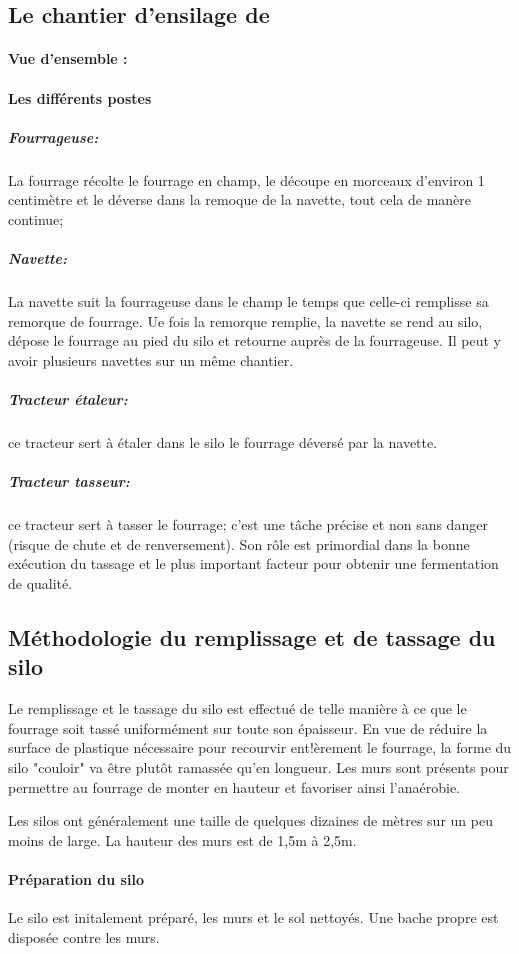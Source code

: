\documentclass[12pt,a4paper]{report}
\begin{document}
\subsection{Le chantier d'ensilage de }

\paragraph{Vue d'ensemble :} 

\paragraph{Les différents postes}
\subparagraph{Fourrageuse:} La fourrage récolte le fourrage en champ, le découpe en morceaux d'environ 1 centimètre et le déverse dans la remoque de la navette, tout cela de manère continue;
\subparagraph{Navette:} La navette suit la fourrageuse dans le champ le temps que celle-ci remplisse sa remorque de fourrage. Ue fois la remorque remplie, la navette se rend au silo, dépose le fourrage au pied du silo et retourne auprès de la fourrageuse. Il peut y avoir plusieurs navettes sur un même chantier.
\subparagraph{Tracteur étaleur:}ce tracteur sert à étaler dans le silo le fourrage déversé par la navette.
\subparagraph{Tracteur tasseur:}ce tracteur sert à tasser le fourrage; c'est une tâche précise et non sans danger (risque de chute et de renversement). Son rôle est primordial dans la bonne exécution du tassage et le plus important facteur pour obtenir une fermentation de qualité.

\subsection{Méthodologie du remplissage et de tassage du silo}

Le remplissage et le tassage du silo est effectué de telle manière à ce que le fourrage soit tassé uniformément sur toute son épaisseur. En vue de réduire la surface de plastique nécessaire pour recourvir ent!èrement le  fourrage, la forme du silo "couloir" va être plutôt ramassée qu'en longueur. Les murs sont présents pour permettre au fourrage de monter en hauteur et favoriser ainsi l'anaérobie.
\newline

Les silos ont généralement une taille de quelques dizaines de mètres sur un peu moins de large. La hauteur des murs est de 1,5m à 2,5m.

\paragraph{Préparation du silo} Le silo est initalement préparé, les murs et le sol nettoyés. Une bache propre est disposée contre les murs.
\end{document}
